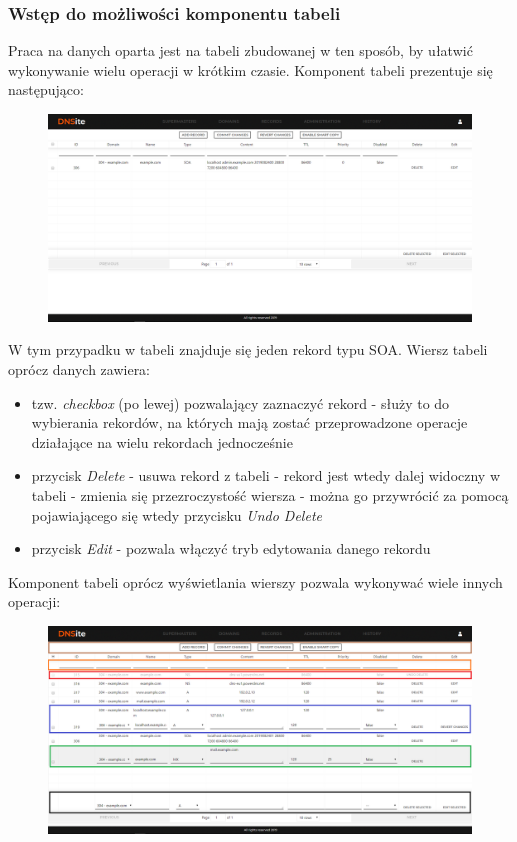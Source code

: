 \documentclass[12pt] {article}
\begin{document}
\subsubsection{Wstęp do możliwości komponentu tabeli}
Praca na danych oparta jest na tabeli zbudowanej w ten sposób, by ułatwić wykonywanie wielu operacji w krótkim czasie. Komponent tabeli prezentuje się następująco:
\begin{figure}[H]
\centering
\includegraphics[width=\textwidth]{res/10_tabela}
\end{figure}
W tym przypadku w tabeli znajduje się jeden rekord typu SOA. Wiersz tabeli oprócz danych zawiera:
\begin{itemize}
\item tzw. \emph{checkbox} (po lewej) pozwalający zaznaczyć rekord - służy to do wybierania rekordów, na których mają zostać przeprowadzone operacje działające na wielu rekordach jednocześnie
\item przycisk \emph{Delete} - usuwa rekord z tabeli - rekord jest wtedy dalej widoczny w tabeli - zmienia się przezroczystość wiersza - można go przywrócić za pomocą pojawiającego się wtedy przycisku \emph{Undo Delete}
\item przycisk \emph{Edit} - pozwala włączyć tryb edytowania danego rekordu
\end{itemize}
Komponent tabeli oprócz wyświetlania wierszy pozwala wykonywać wiele innych operacji:
\begin{figure}[H]
\centering
\includegraphics[width=\textwidth]{res/11_tabela_komponenty}
\end{figure}
\end{document}
